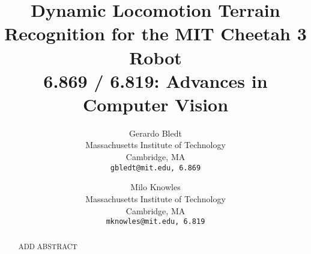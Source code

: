 \documentclass[10pt,twocolumn,letterpaper]{article}
\begin{document}
\title{Dynamic Locomotion Terrain Recognition for the MIT Cheetah 3 Robot \\ 6.869 / 6.819: Advances in Computer Vision}

\author{Gerardo Bledt\\
Massachusetts Institute of Technology\\
Cambridge, MA\\
{\tt\small gbledt@mit.edu, 6.869}
\and
Milo Knowles\\
Massachusetts Institute of Technology\\
Cambridge, MA\\
{\tt\small mknowles@mit.edu, 6.819}
}

\maketitle

\begin{abstract}
   ADD ABSTRACT
\end{abstract}






{\small


}
\end{document}

